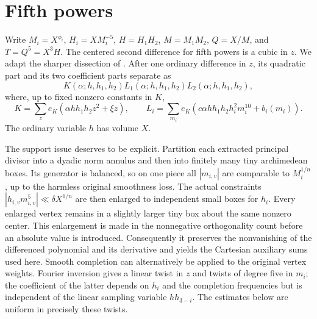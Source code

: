\documentclass[11pt]{amsart}
\theoremstyle{definition}
\numberwithin{equation}{section}
\begin{document}
\section{Fifth powers}
\label{sec:k5-terminal}

Write $M_i=X^{\phi_i}$, $H_i=XM_i^{-5}$, $H=H_1H_2$,
$M=M_1M_2$, $Q=X/M$, and $T=Q^5=X^3H$.
The centered second difference for fifth powers is a cubic in $z$.
We adapt the sharper dissection of \cite[Lemma~6.1]{VW1995}.
After one ordinary difference in $z$, its quadratic part and its two
coefficient parts separate as
\[
 K(\alpha;h,h_1,h_2)
 L_1(\alpha;h,h_1,h_2)L_2(\alpha;h,h_1,h_2),
\]
where, up to fixed nonzero constants in $K$,
\[
 K=\sum_z e_K(\alpha hh_1h_2 z^2+\xi z),\qquad
 L_i=\sum_{m_i}e_K(c\alpha hh_1h_2h_i^2m_i^{10}+b_i(m_i)).
\]
The ordinary variable $h$ has volume $X$.

The support issue deserves to be explicit.  Partition each extracted
principal divisor into a dyadic norm annulus and then into finitely many
tiny archimedean boxes.  Its generator is balanced, so on one piece all
$|m_{i,v}|$ are comparable to $M_i^{1/n}$, up to the harmless original
smoothness loss.  The actual constraints
$|h_{i,v}m_{i,v}^5|\ll\delta X^{1/n}$ are then enlarged to independent
small boxes for $h_i$.  Every enlarged vertex remains in a slightly larger
tiny box about the same nonzero center.  This enlargement is made in the
nonnegative orthogonality count before an absolute value is introduced.
Consequently it preserves the nonvanishing of the differenced polynomial
and its derivative and yields the Cartesian auxiliary sums used here.
Smooth completion can alternatively be applied to the original vertex
weights.  Fourier inversion gives a linear twist in $z$ and twists of
degree five in $m_i$; the coefficient of the latter depends on $h_i$ and the
completion frequencies but is independent of the linear sampling variable
$hh_{3-i}$.  The estimates below are uniform in precisely these twists.
\end{document}
